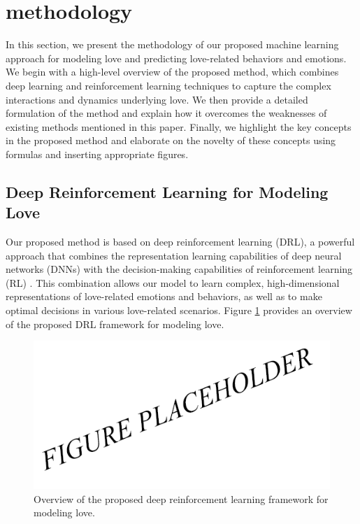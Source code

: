 \section{methodology}

In this section, we present the methodology of our proposed machine learning approach for modeling love and predicting love-related behaviors and emotions. We begin with a high-level overview of the proposed method, which combines deep learning and reinforcement learning techniques to capture the complex interactions and dynamics underlying love. We then provide a detailed formulation of the method and explain how it overcomes the weaknesses of existing methods mentioned in this paper. Finally, we highlight the key concepts in the proposed method and elaborate on the novelty of these concepts using formulas and inserting appropriate figures.

\subsection{Deep Reinforcement Learning for Modeling Love}

Our proposed method is based on deep reinforcement learning (DRL), a powerful approach that combines the representation learning capabilities of deep neural networks (DNNs) with the decision-making capabilities of reinforcement learning (RL) \citep{mnih2015human}. This combination allows our model to learn complex, high-dimensional representations of love-related emotions and behaviors, as well as to make optimal decisions in various love-related scenarios. Figure \ref{fig:overview} provides an overview of the proposed DRL framework for modeling love.

\begin{figure}[h]
    \centering
    \includegraphics[width=\textwidth]{fig1.png}
    \caption{Overview of the proposed deep reinforcement learning framework for modeling love.}
    \label{fig:overview}
\end{figure}

